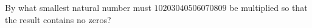 By what smallest natural number must $10203040506070809$ be multiplied so that the result contains no zeros?
